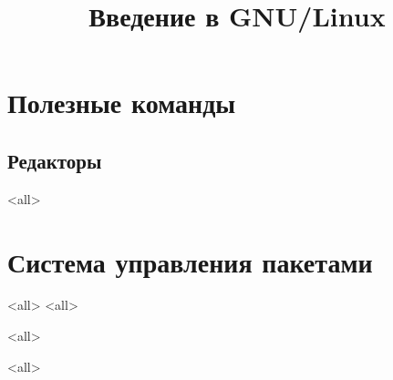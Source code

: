 

\title{Введение в GNU/Linux}








\begin{frame}
	\frametitle{}
	\titlepage
	\vspace{-0.5cm}
	\begin{center}
	\end{center}
\end{frame}



\section{Полезные команды}
\subsection{Редакторы}
\mode<all>{}

\section{Система управления пакетами}

\mode<all>{}
\mode<all>{}

\mode<all>{}

\mode<all>{}


